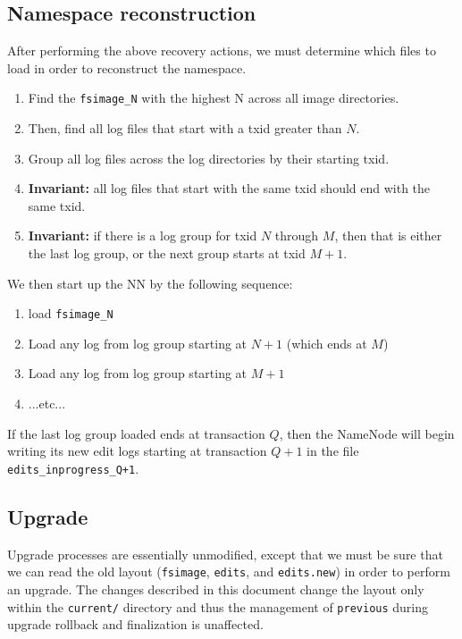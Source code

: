 \documentclass{article}
\begin{document}
\subsection{Namespace reconstruction}
\label{ns-reconstruction}
After performing the above recovery actions, we must determine which files to load in order to reconstruct the namespace.

\begin{enumerate}
\item Find the {\tt fsimage\_N} with the highest N across all image directories.
\item Then, find all log files that start with a txid greater than $N$.
\item Group all log files across the log directories by their starting txid.
\item {\bf Invariant:} all log files that start with the same txid should end with the same txid.
\item {\bf Invariant:} if there is a log group for txid $N$ through $M$, then that is either the last log group, or the next group starts at txid $M+1$.
\end{enumerate}

We then start up the NN by the following sequence:
\begin{enumerate}
\item load {\tt fsimage\_N}
\item Load any log from log group starting at $N+1$ (which ends at $M$)
\item Load any log from log group starting at $M+1$
\item ...etc...
\end{enumerate}

If the last log group loaded ends at transaction $Q$, then the NameNode will begin writing its new edit logs starting
at transaction $Q+1$ in the file {\tt edits\_inprogress\_Q+1}.

\subsection{Upgrade}

Upgrade processes are essentially unmodified, except that we must be sure that we can read the old layout ({\tt fsimage}, {\tt edits}, and {\tt edits.new}) in order to perform an upgrade. The changes described in this document change the layout only within the {\tt current/} directory and thus the management of {\tt previous} during upgrade rollback and finalization is unaffected.
\end{document}
